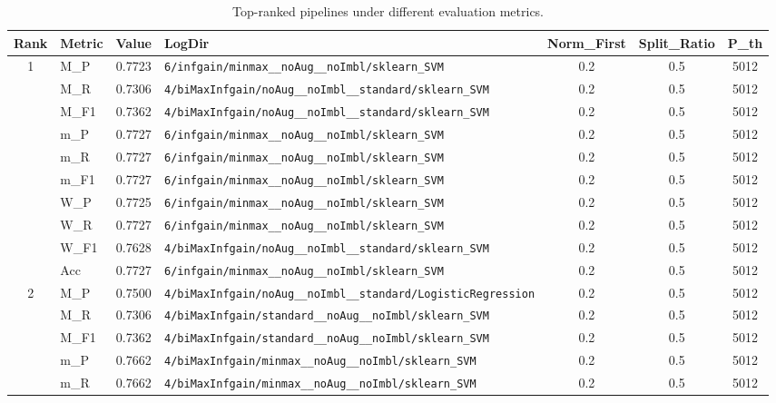 \begin{table}[htbp]
\caption{Top-ranked pipelines under different evaluation metrics.}
\label{tab:rank_metric_vertical}
\centering
\small
\setlength{\tabcolsep}{4pt}
\begin{tabular}{|c|l|c|>{\ttfamily\footnotesize}p{7.2cm}|c|c|c|}
\hline
Rank & Metric & Value & LogDir & Norm\_First & Split\_Ratio & P\_th \\
\hline
\multirow{10}{*}{1} & M\_P & 0.7723 & \texttt{6/infgain/minmax\_\_noAug\_\_noImbl/sklearn\_SVM} & 0.2 & 0.5  & 5012 \\ 
 & M\_R & 0.7306 & \texttt{4/biMaxInfgain/noAug\_\_noImbl\_\_standard/sklearn\_SVM} & 0.2 & 0.5  & 5012 \\ 
 & M\_F1 & 0.7362 & \texttt{4/biMaxInfgain/noAug\_\_noImbl\_\_standard/sklearn\_SVM} & 0.2 & 0.5  & 5012 \\ 
 & m\_P & 0.7727 & \texttt{6/infgain/minmax\_\_noAug\_\_noImbl/sklearn\_SVM} & 0.2 & 0.5  & 5012 \\ 
 & m\_R & 0.7727 & \texttt{6/infgain/minmax\_\_noAug\_\_noImbl/sklearn\_SVM} & 0.2 & 0.5  & 5012 \\ 
 & m\_F1 & 0.7727 & \texttt{6/infgain/minmax\_\_noAug\_\_noImbl/sklearn\_SVM} & 0.2 & 0.5  & 5012 \\ 
 & W\_P & 0.7725 & \texttt{6/infgain/minmax\_\_noAug\_\_noImbl/sklearn\_SVM} & 0.2 & 0.5  & 5012 \\ 
 & W\_R & 0.7727 & \texttt{6/infgain/minmax\_\_noAug\_\_noImbl/sklearn\_SVM} & 0.2 & 0.5  & 5012 \\ 
 & W\_F1 & 0.7628 & \texttt{4/biMaxInfgain/noAug\_\_noImbl\_\_standard/sklearn\_SVM} & 0.2 & 0.5  & 5012 \\ 
 & Acc & 0.7727 & \texttt{6/infgain/minmax\_\_noAug\_\_noImbl/sklearn\_SVM} & 0.2 & 0.5  & 5012 \\ 
\hline
\multirow{10}{*}{2} & M\_P & 0.7500 & \texttt{4/biMaxInfgain/noAug\_\_noImbl\_\_standard/LogisticRegression} & 0.2 & 0.5  & 5012 \\ 
 & M\_R & 0.7306 & \texttt{4/biMaxInfgain/standard\_\_noAug\_\_noImbl/sklearn\_SVM} & 0.2 & 0.5  & 5012 \\ 
 & M\_F1 & 0.7362 & \texttt{4/biMaxInfgain/standard\_\_noAug\_\_noImbl/sklearn\_SVM} & 0.2 & 0.5  & 5012 \\ 
 & m\_P & 0.7662 & \texttt{4/biMaxInfgain/minmax\_\_noAug\_\_noImbl/sklearn\_SVM} & 0.2 & 0.5  & 5012 \\ 
 & m\_R & 0.7662 & \texttt{4/biMaxInfgain/minmax\_\_noAug\_\_noImbl/sklearn\_SVM} & 0.2 & 0.5  & 5012 \\ 

\end{tabular}
\end{table}
